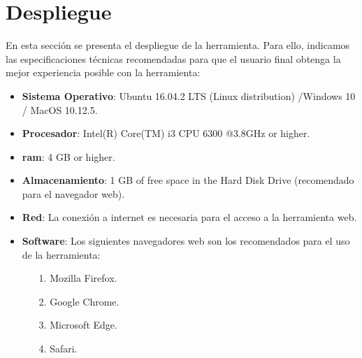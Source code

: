 \section{Despliegue}
\label{sec:deployment}

En esta sección se presenta el despliegue de la herramienta. Para ello, indicamos las especificaciones técnicas recomendadas para que el usuario final obtenga la mejor experiencia posible con la herramienta:

\begin{itemize}

\item \textbf{Sistema Operativo}: Ubuntu 16.04.2 LTS (Linux distribution) /Windows 10 / MacOS 10.12.5.

\item \textbf{Procesador}: Intel(R) Core(TM) i3 CPU 6300 @3.8GHz or higher.

\item \textbf{\gls{ram}}: 4 GB or higher.

\item \textbf{Almacenamiento}: 1 GB of free space in the Hard Disk Drive (recomendado para el navegador web).

\item \textbf{Red}: La conexión a internet es necesaria para el acceso a la herramienta web.

\item \textbf{Software}: Los siguientes navegadores web son los recomendados para el uso de la herramienta:

	\begin{itemize}

	\item[1.] Mozilla Firefox.
	
	\item[2.] Google Chrome.
	
	\item[3.] Microsoft Edge.
	
	\item[4.] Safari.

	\end{itemize}

\end{itemize}

